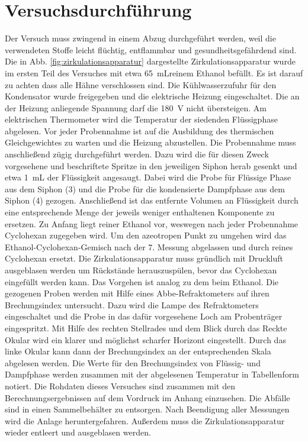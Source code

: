 
\section{Versuchsdurchführung}
\label{sec:durchfuerung}

Der Versuch muss zwingend in einem Abzug durchgeführt werden, weil die verwendeten Stoffe leicht flüchtig, entflammbar und gesundheitsgefährdend sind. Die in Abb. \ref{fig:zirkulationsapparatur} dargestellte Zirkulationsapparatur wurde im ersten Teil des Versuches mit etwa \SI{65}{\milli\liter}reinem Ethanol befüllt. Es ist darauf zu achten dass alle Hähne verschlossen sind. Die Kühlwasserzufuhr für den Kondensator wurde freigegeben und die elektrische Heizung eingeschaltet. Die an der Heizung anliegende Spannung darf die \SI{180}{\volt } nicht übersteigen. Am elektrischen Thermometer wird die Temperatur der siedenden Flüssigphase abgelesen. Vor jeder Probennahme ist auf die Ausbildung des thermischen Gleichgewichtes zu warten und die Heizung abzustellen. Die Probennahme muss anschließend zügig durchgeführt werden. Dazu wird die für diesen Zweck vorgesehene und beschriftete Spritze in den jeweiligen Siphon herab gesenkt und etwa \SI{1}{\milli\liter} der Flüssigkeit angesaugt. Dabei wird die Probe für Flüssige Phase aus dem Siphon (3) und die Probe für die kondensierte Dampfphase aus dem Siphon (4) gezogen. Anschließend ist das entfernte Volumen an Flüssigkeit durch eine entsprechende Menge der jeweils weniger enthaltenen Komponente zu ersetzen. Zu Anfang liegt reiner Ethanol vor, weswegen nach jeder Probennahme Cyclohexan zugegeben wird. Um den azeotropen Punkt zu umgehen wird das Ethanol-Cyclohexan-Gemisch nach der 7. Messung abgelassen und durch reines Cyclohexan ersetzt. Die Zirkulationsapparatur muss gründlich mit Druckluft ausgeblasen werden um Rückstände herauszuspülen, bevor das Cyclohexan eingefüllt werden kann. Das Vorgehen ist analog zu dem beim Ethanol. Die gezogenen Proben werden mit Hilfe eines Abbe-Refraktometers auf ihren Brechungsindex untersucht. Dazu wird die Lampe des Refraktometers eingeschaltet und die Probe in das dafür vorgesehene Loch am Probenträger eingespritzt. Mit Hilfe des rechten Stellrades und dem Blick durch das Reckte Okular wird ein klarer und möglichst scharfer Horizont eingestellt. Durch das linke Okular kann dann der Brechungsindex an der entsprechenden Skala abgelesen werden. Die Werte für den Brechungsindex von Flüssig- und Dampfphase werden zusammen mit der abgelesenen Temperatur in Tabellenform notiert. Die Rohdaten dieses Versuches sind zusammen mit den Berechnungsergebnissen auf dem Vordruck im Anhang einzusehen.
Die Abfälle sind in einen Sammelbehälter zu entsorgen. Nach Beendigung aller Messungen wird die Anlage heruntergefahren. Außerdem muss die Zirkulationsapparatur wieder entleert und ausgeblasen werden.
